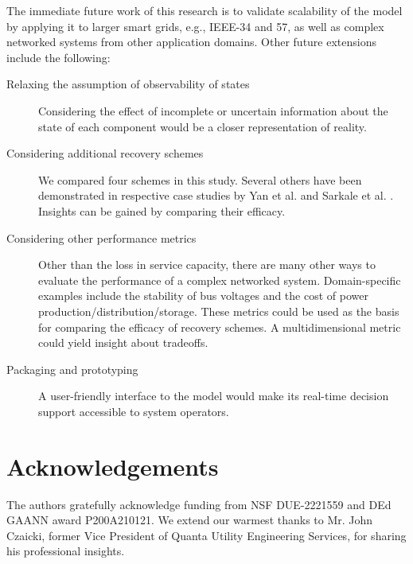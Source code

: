 \documentclass[runningheads]{llncs}
\begin{document}
The immediate future work of this research is to validate scalability of the model by applying it to larger smart grids, e.g., IEEE-34 and 57, as well as complex networked systems from other application domains. Other future extensions include the following:
\begin{description}
    \item[Relaxing the assumption of observability of states] Considering the effect of incomplete or uncertain information about the state of each component would be a closer representation of reality. 
    \item [Considering additional recovery schemes] We compared four schemes in this study. Several others have been demonstrated in respective case studies by Yan et al. \cite{yan_dynamic_2021} and Sarkale et al. \cite{sarkale_solving_2018}. Insights can be gained by comparing their efficacy.
    \item [Considering other performance metrics] Other than the loss in service capacity, there are many other ways to evaluate the performance of a complex networked system. Domain-specific examples include the stability of bus voltages and the cost of power production/distribution/storage. These metrics could be used as the basis for comparing the efficacy of recovery schemes. A multidimensional metric could yield insight about tradeoffs. 
    \item [Packaging and prototyping] A user-friendly interface to the model would make its real-time decision support accessible to system operators.

\end{description}


\section{Acknowledgements}
The authors gratefully acknowledge funding from NSF DUE-2221559 and DEd GAANN award  P200A210121. We extend our warmest thanks to Mr. John Czaicki, former Vice President of Quanta Utility Engineering Services, for sharing his professional insights.
\pagebreak




\end{document}
